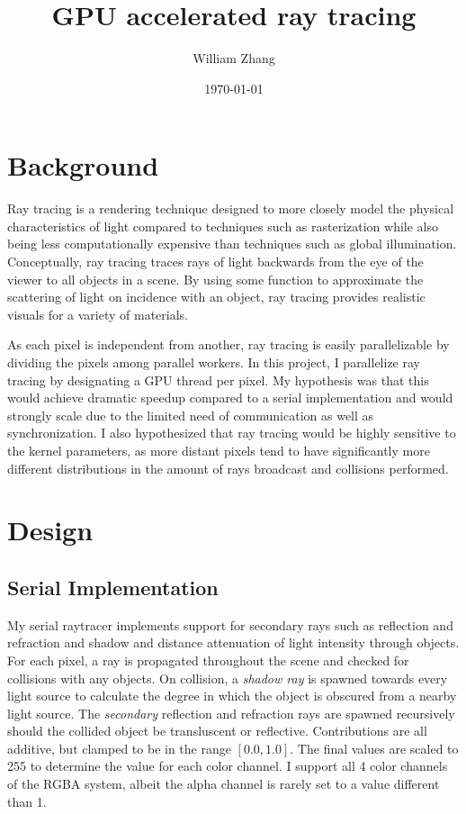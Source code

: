 \documentclass[11pt]{article}
\title{GPU accelerated ray tracing}
\author{William Zhang}
\date{\today}
\begin{document}
\maketitle
\section{Background}
Ray tracing is a rendering technique designed to more closely model the physical characteristics
of light compared to techniques such as rasterization while also being less computationally
expensive than techniques such as global illumination. Conceptually, ray tracing traces rays of light
backwards from the eye of the viewer to all objects in a scene. By using some function to approximate
the scattering of light on incidence with an object, ray tracing provides realistic visuals for a 
variety of materials.

As each pixel is independent from another, ray tracing is easily parallelizable by dividing the 
pixels among parallel workers. In this project, I parallelize ray tracing by designating a
GPU thread per pixel. My hypothesis was that this would achieve dramatic speedup compared to a
serial implementation and would strongly scale due to the limited need of communication as well
as synchronization. I also hypothesized that ray tracing would be highly sensitive to the kernel
parameters, as more distant pixels tend to have significantly more different distributions in 
the amount of rays broadcast and collisions performed.

\section{Design}
\subsection{Serial Implementation}
My serial raytracer implements support for secondary rays such as reflection and refraction and
shadow and distance attenuation of light intensity through objects. For each pixel, a ray is propagated
throughout the scene and checked for collisions with any objects. On collision, a \textit{shadow ray} is 
spawned towards every light source to calculate the degree in which the object is obscured from a nearby
light source. The \textit{secondary} reflection and refraction rays are spawned recursively should the collided object be 
transluscent or reflective. Contributions are all additive, but clamped to be in the range $[0.0, 1.0]$.
The final values are scaled to 255 to determine the value for each color channel. I support all 4 color
channels of the RGBA system, albeit the alpha channel is rarely set to a value different than 1.
\end{document}
